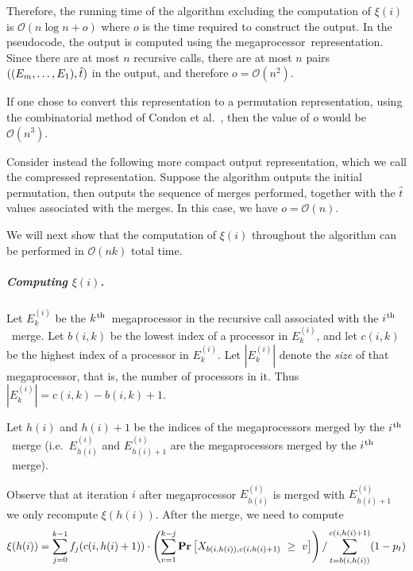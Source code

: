 \documentclass{article}
\newcounter{ass}
\newcommand{\ens}[1]{\ensuremath{#1}}					\newcommand{\card}[1]{\ens{|#1|}}							\newcommand{\dotlist}[2]{\ens{#1,\ldots,#2}}
\newcommand{\bigoh}[1]{\ens{\mathcal{O}(#1)}}				\newcommand{\bigom}[1]{\ens{\Omega(#1)}}
\newcommand{\ith}{\ens{i^{\mbox{\hspace{.2mm}\scriptsize th}}}}
\newcommand{\kth}{\ens{k^{ \mbox{\hspace{.2mm}\scriptsize th}}}}
\newcommand{\valn}{\ens{n}}
\newcommand{\valk}{\ens{k}}
\newcommand{\processor}{processor}
\newcommand{\megaprocessor}{mega\processor}
\newcommand{\probgen}[1]{\ens{\mathbf{Pr}\left[#1\right]}}
\newcommand{\hitsum}[2]{\ens{X_{#1,#2}}}					\newcommand{\probeq}[3]{\probgen{\hitsum{#1}{#2}~=~#3}}
\newcommand{\probge}[3]{\probgen{\hitsum{#1}{#2}~\geq~#3}}
\newcommand{\flowin}[2]{\ens{f_{#1}(#2)}}
\newcommand{\mergeop}[2]{\ens{E_{#2}^{(#1)}}}
\newcommand{\mopfirst}[2]{\ens{b{(#1,#2)}}}
\newcommand{\moplast}[2]{\ens{c{(#1,#2)}}}
\newcommand{\mindex}[1]{\ens{h(#1)}}
\newcommand{\themergeop}[1]{\ens{\mergeop{#1}{\mindex{#1}}}}
\newcommand{\themergeoplus}[1]{\ens{\mergeop{#1}{\mindex{#1}+1}}}
\begin{document}
Therefore, the running time of the algorithm excluding the computation of $\xi(i)$ is \bigoh{n\log n + o} where $o$ is the time required to construct the output. 
In the pseudocode, the output is computed using the \megaprocessor\ representation.
Since there are at most $n$
recursive calls, there are at most $n$ pairs
$((\dotlist{\megaop m}{\megaop 1}),\hat{t})$ in
the output, and therefore $o = \bigoh{n^{2}}$.

If one chose to convert this representation to a permutation representation,
using the combinatorial method of Condon et al.~\cite{journals/talg/CondonDHW09},
then the value of $o$ would be $\bigoh{n^3}$.

Consider instead the following
more compact output representation, which we call the compressed representation. 
Suppose the algorithm outputs the initial permutation, then 
outputs the sequence of merges performed, together with the $\hat{t}$ values
associated with the merges. In this case, we have $o=\bigoh n$.

We will next show that the computation of $\xi(i)$ throughout the algorithm can be performed in \bigoh{\valn\valk} total time. 

\subparagraph{Computing $\xi(i)$.}
Let \mergeop ik be the \kth\ {\megaprocessor} in the
recursive call associated with the \ith\ merge. 
Let \mopfirst ik be the lowest index of a {\processor} in \mergeop ik, and let \moplast ik be the highest index of a {\processor} in \mergeop ik. 
Let $\card{\mergeop ik}$ denote the {\em size} of that {\megaprocessor},
that is, the number of {\processor}s in it.
Thus $\card{\mergeop ik} = \moplast ik - \mopfirst ik + 1$.

Let \mindex i and $\mindex {i}+1$ be the indices of the {\megaprocessor}s merged by the \ith\ merge (i.e.~\themergeop i and \themergeoplus i are the {\megaprocessor}s merged by the \ith\ merge).

Observe that at iteration $i$ after {\megaprocessor} \themergeop i is merged with \themergeoplus i we only recompute $\xi(\mindex i)$. After the merge, we need to compute
\[
\xi(\mindex i) =  \sum_{j=0}^{k-1} \flowin{j}{\moplast i{\mindex i + 1}}\cdot\left(	\sum_{v= 1}^{k-j} \probge{	\mopfirst i{\mindex i}}{\moplast i{\mindex i + 1}}{v}		\right) / 
\sum_{t=\mopfirst i{\mindex i}}^{\moplast i{\mindex i+1}} (1-\pr t)
\]
\end{document}
